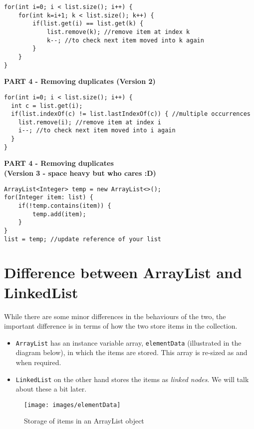 \begin{lstlisting}
for(int i=0; i < list.size(); i++) {
	for(int k=i+1; k < list.size(); k++) {
		if(list.get(i) == list.get(k) {
			list.remove(k); //remove item at index k
			k--; //to check next item moved into k again
		}
	}
}
\end{lstlisting}

\begin{center}
\textbf{PART 4 - Removing duplicates (Version 2)}	
\end{center}

\begin{lstlisting}
for(int i=0; i < list.size(); i++) {
  int c = list.get(i);
  if(list.indexOf(c) != list.lastIndexOf(c)) { //multiple occurrences
	list.remove(i); //remove item at index i
	i--; //to check next item moved into i again
  }
}
\end{lstlisting}

\begin{center}
\textbf{PART 4 - Removing duplicates \\ (Version 3 - space heavy but who cares :D)}	
\end{center}

\begin{lstlisting}
ArrayList<Integer> temp = new ArrayList<>();
for(Integer item: list) {
	if(!temp.contains(item)) {
		temp.add(item);
  	}
}
list = temp; //update reference of your list
\end{lstlisting}

\section{Difference between ArrayList and LinkedList}

While there are some minor differences in the behaviours of the two, the important difference is in terms of how the two store items in the collection.

\begin{itemize}
  \item \texttt{ArrayList} has an instance variable array, \texttt{elementData} (illustrated in the diagram below), in which the items are stored. This array is re-sized as and when required. 
  
\item \texttt{LinkedList} on the other hand stores the items as \emph{linked nodes}. We will talk about these a bit later.
\end{itemize}

\begin{figure}[h!]
  \caption{Storage of items in an ArrayList object}
  \texttt{[image: images/elementData]}
\end{figure}

